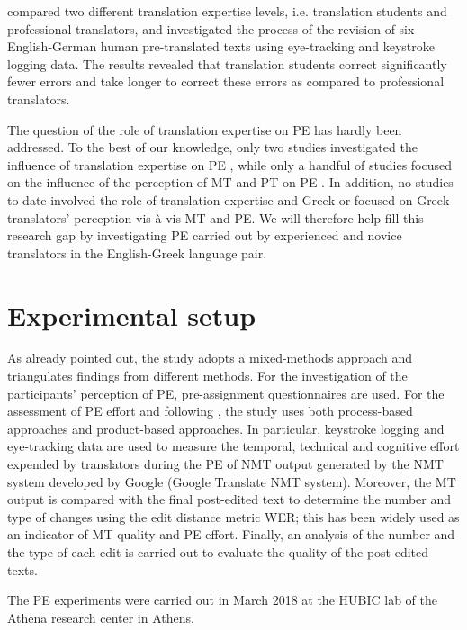 \documentclass[output=paper]{langscibook}
\begin{document}
\citet{SchaefferHansen-Schirra2019} compared two different translation expertise levels, i.e. translation students and professional translators, and investigated the process of the revision of six English-German human pre-translated texts using eye-tracking and keystroke logging data. The results revealed that translation students correct significantly fewer errors and take longer to correct these errors as compared to professional translators.

The question of the role of translation expertise on PE has hardly been addressed. To the best of our knowledge, only two studies investigated the influence of translation expertise on PE \citep{moorkens-obrien-2015-post, nitzke2019problem}, while only a handful of studies focused on the influence of the perception of MT and PT on PE \citep{moorkens-obrien-2015-post}. In addition, no studies to date involved the role of translation expertise and Greek or focused on Greek translators’ perception vis-à-vis MT and PE. We will therefore help fill this research gap by investigating PE carried out by experienced and novice translators in the English-Greek language pair.


\section{Experimental setup}
As already pointed out, the study adopts a mixed-methods approach and triangulates findings from different methods. For the investigation of the participants’ perception of PE, pre-assignment questionnaires are used. For the assessment of PE effort and following \citet{KoponenNikulin2019}, the study uses both process-based approaches and product-based approaches. In particular, keystroke logging and eye-tracking data are used to measure the temporal, technical and cognitive effort expended by translators during the PE of NMT output generated by the NMT system developed by Google (Google Translate NMT system). Moreover, the MT output is compared with the final post-edited text to determine the number and type of changes using the edit distance metric WER; this has been widely used as an indicator of MT quality and PE effort. Finally, an analysis of the number and the type of each edit is carried out to evaluate the quality of the post-edited texts.

The PE experiments were carried out in March 2018 at the HUBIC lab \citep{RaptisGiagkou2016} of the Athena research center in Athens.
\end{document}
